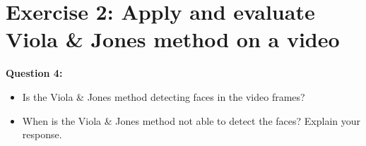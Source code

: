 \section{Exercise 2: Apply and evaluate Viola & Jones method on a video}

{\bfseries
Question 4:
\begin{itemize}
\item Is the Viola \& Jones method detecting faces in the video frames?
\item When is the Viola \& Jones method not able to detect the faces? Explain
			your response.
\end{itemize}
}